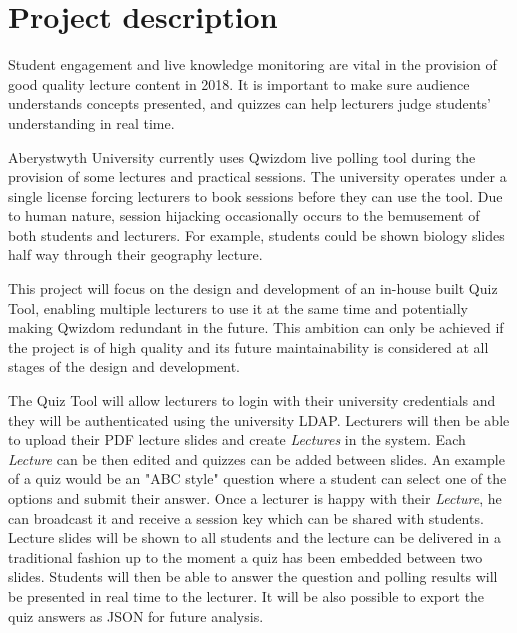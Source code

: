 \documentclass[11pt,fleqn,twoside]{article}
\begin{document}
\wordcount{}

\mmp

\setcounter{tocdepth}{3} %

\section{Project description}
Student engagement and live knowledge monitoring are vital in the provision of good quality
lecture content in 2018. It is important to make sure audience understands concepts presented,
and quizzes can help lecturers judge students' understanding in real time.

Aberystwyth University currently uses Qwizdom\cite{1} live polling tool during the provision
of some lectures and practical sessions. The university operates under a single license
forcing lecturers to book sessions before they can use the tool. Due to human nature,
session hijacking occasionally occurs to the bemusement of both students and lecturers.
For example, students could be shown biology slides half way through their geography
lecture.

This project will focus on the design and development of an in-house built Quiz Tool,
enabling multiple lecturers to use it at the same time and potentially making Qwizdom
redundant in the future. This ambition can only be achieved if the project is of
high quality and its future maintainability is considered at all stages of the design
and development.

The Quiz Tool will allow lecturers to login with their university credentials and
they will be authenticated using the university LDAP. Lecturers will then
be able to upload their PDF lecture slides and create \textit{Lectures} in the system.
Each \textit{Lecture} can be then edited and quizzes can be added between slides.
An example of a quiz would be an "ABC style" question where a student can select
one of the options and submit their answer. Once a lecturer is happy with their
\textit{Lecture}, he can broadcast it and receive a session key which can be
shared with students. Lecture slides will be shown to all students and the
lecture can be delivered in a traditional fashion up to the moment a quiz
has been embedded between two slides. Students will then be able to answer
the question and polling results will be presented in real time to the lecturer.
It will be also possible to export the quiz answers as JSON for future analysis.
\end{document}
